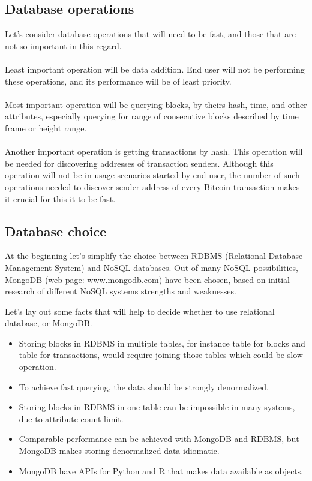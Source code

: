 \documentclass[12pt, en, eng, oneside]{mgr}
\begin{document}
\subsection{Database operations}
Let's consider database operations that will need to be fast, and those that are not so important in this regard.
\\
\\
Least important operation will be data addition. End user will not be performing these operations, and its performance will be of least priority.
\\
\\
Most important operation will be querying blocks, by theirs hash, time, and other attributes, especially querying for range of consecutive blocks described by time frame or height range.
\\
\\
Another important operation is getting transactions by hash. This operation will be needed for discovering addresses of transaction senders. Although this operation will not be in usage scenarios started by end user, the number of such operations needed to discover sender address of every Bitcoin transaction makes it crucial for this it to be fast.

\subsection{Database choice}
At the beginning let's simplify the choice between RDBMS (Relational Database Management System) and NoSQL databases. Out of many NoSQL possibilities, MongoDB (web page: www.mongodb.com) have been chosen, based on initial research of different NoSQL systems strengths and weaknesses.


Let's lay out some facts that will help to decide whether to use relational database, or MongoDB.

\begin{itemize}
\item 
Storing blocks in RDBMS in multiple tables, for instance table for blocks and table for transactions, would require joining those tables which could be slow operation.
\item 
To achieve fast querying, the data should be strongly denormalized.
\item
Storing blocks in RDBMS in one table can be impossible in many systems, due to attribute count limit.
\item 
Comparable performance can be achieved with MongoDB and RDBMS, but MongoDB makes storing denormalized data idiomatic.
\item
MongoDB have APIs for Python and R that makes data available as objects.
\end{itemize}
\end{document}
